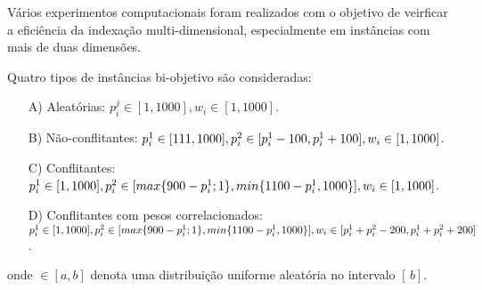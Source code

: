 Vários experimentos computacionais foram realizados com o objetivo de veirficar
a eficiência da indexação multi-dimensional, especialmente em instâncias com
mais de duas dimensões.



Quatro tipos de instâncias bi-objetivo são consideradas:
\begin{enumerate}
  \item[A)] Aleatórias: $
    p^j_i \in [1, 1000],
    w_i \in [1,1000]$.
  \item[B)] Não-conflitantes: $
    p^1_i \in [111, 1000],\\
    p^2_i \in [p^1_i - 100, p^1_i + 100],\\
    w_i \in [1,1000]$.
  \item[C)] Conflitantes: $
    p^1_i \in [1, 1000],\\
    p^2_i \in [max\{900-p^1_i;1\}, min\{1100-p^1_i, 1000\}],\\
    w_i \in [1,1000]$.
  \item[D)] Conflitantes com pesos correlacionados: $
    p^1_i \in [1, 1000],\\
    p^2_i \in [max\{900-p^1_i;1\}, min\{1100-p^1_i, 1000\}],\\
    w_i \in [p^1_i+p^2_i-200, p^1_i+p^2_i+200]$.
\end{enumerate}
onde $\in [a,b]$ denota uma distribuição uniforme aleatória no intervalo
$[\,b]$.


